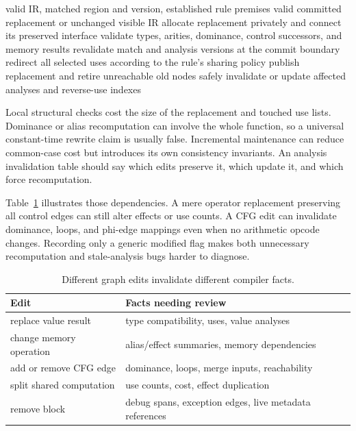 \begin{algorithm}[htbp]
\caption{Commit an IR graph rewrite only after structural and semantic checks succeed.}
\label{alg:ch87-commit}
\begin{pseudocode}
\Require valid IR, matched region and version, established rule premises
\Ensure valid committed replacement or unchanged visible IR
\State allocate replacement privately and connect its preserved interface
\State validate types, arities, dominance, control successors, and memory results
\State revalidate match and analysis versions at the commit boundary
\State redirect all selected uses according to the rule's sharing policy
\State publish replacement and retire unreachable old nodes safely
\State invalidate or update affected analyses and reverse-use indexes
\end{pseudocode}
\end{algorithm}

Local structural checks cost the size of the replacement and touched use lists.
Dominance or alias recomputation can involve the whole function, so a universal constant-time rewrite claim is usually false.
Incremental maintenance can reduce common-case cost but introduces its own consistency invariants.
An analysis invalidation table should say which edits preserve it, which update it, and which force recomputation.

Table~\ref{tab:ch87-invalidation} illustrates those dependencies.
A mere operator replacement preserving all control edges can still alter effects or use counts.
A CFG edit can invalidate dominance, loops, and phi-edge mappings even when no arithmetic opcode changes.
Recording only a generic modified flag makes both unnecessary recomputation and stale-analysis bugs harder to diagnose.

\begin{table}[htbp]
\caption{Different graph edits invalidate different compiler facts.}
\label{tab:ch87-invalidation}
\centering
\begin{tabular}{ll}
\toprule
Edit & Facts needing review \\
\midrule
replace value result & type compatibility, uses, value analyses \\
change memory operation & alias/effect summaries, memory dependencies \\
add or remove CFG edge & dominance, loops, merge inputs, reachability \\
split shared computation & use counts, cost, effect duplication \\
remove block & debug spans, exception edges, live metadata references \\
\bottomrule
\end{tabular}
\end{table}

